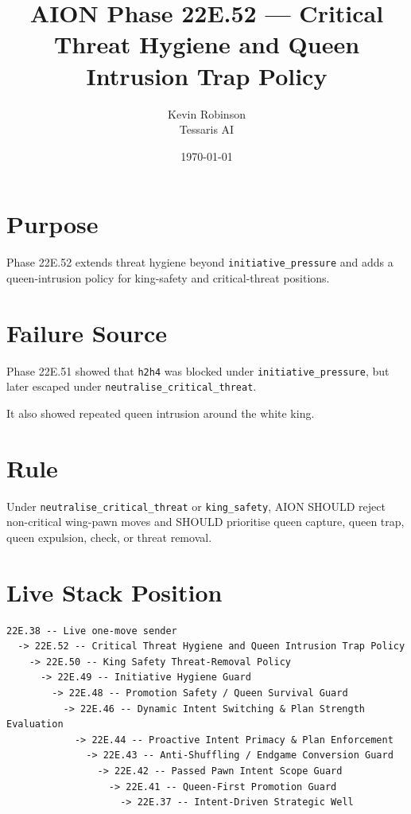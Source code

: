 \documentclass[11pt,a4paper]{article}
\title{\textbf{AION Phase 22E.52 --- Critical Threat Hygiene and Queen Intrusion Trap Policy}}
\author{Kevin Robinson\\Tessaris AI}
\date{\today}
\begin{document}
\maketitle

\section{Purpose}

Phase 22E.52 extends threat hygiene beyond \texttt{initiative\_pressure} and adds a queen-intrusion policy for king-safety and critical-threat positions.

\section{Failure Source}

Phase 22E.51 showed that \texttt{h2h4} was blocked under \texttt{initiative\_pressure}, but later escaped under \texttt{neutralise\_critical\_threat}.

It also showed repeated queen intrusion around the white king.

\section{Rule}

Under \texttt{neutralise\_critical\_threat} or \texttt{king\_safety}, AION SHOULD reject non-critical wing-pawn moves and SHOULD prioritise queen capture, queen trap, queen expulsion, check, or threat removal.

\section{Live Stack Position}

\begin{verbatim}
22E.38 -- Live one-move sender
  -> 22E.52 -- Critical Threat Hygiene and Queen Intrusion Trap Policy
    -> 22E.50 -- King Safety Threat-Removal Policy
      -> 22E.49 -- Initiative Hygiene Guard
        -> 22E.48 -- Promotion Safety / Queen Survival Guard
          -> 22E.46 -- Dynamic Intent Switching & Plan Strength Evaluation
            -> 22E.44 -- Proactive Intent Primacy & Plan Enforcement
              -> 22E.43 -- Anti-Shuffling / Endgame Conversion Guard
                -> 22E.42 -- Passed Pawn Intent Scope Guard
                  -> 22E.41 -- Queen-First Promotion Guard
                    -> 22E.37 -- Intent-Driven Strategic Well
\end{verbatim}
\end{document}
